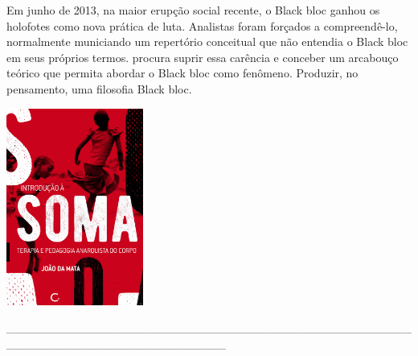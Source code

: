 \medskip

\noindent{}Em junho de 2013, na maior erupção social recente, o Black bloc ganhou os holofotes como nova prática de luta. Analistas foram forçados a compreendê-lo, normalmente municiando um repertório conceitual que não entendia o Black bloc em seus próprios termos. {} procura suprir essa carência e conceber um arcabouço teórico que permita abordar o Black bloc como fenômeno. Produzir, no pensamento, uma filosofia Black bloc.

\hspace{.5cm}

\hspace*{-.4cm}\begin{minipage}[c]{0.45\linewidth}
\small{
{}}
\end{minipage}

\pagebreak

\hspace{.5cm}

\begin{center}
\hspace*{-.5cm}\includegraphics[width=45mm]{./imgs/soma.jpg}
\end{center}

\hspace*{-2cm}\_\_\_\_\_\_\_\_\_\_\_\_\_\_\_\_\_\_\_\_\_\_\_\_\_\_\_\_\_\_\_\_\_\_\_\_\_\_\_\_\_\_\_\_\_\_\_\_\_\_\_\_\_\_\_\_\_\_\_\_\_\_\_\_\_\_\_\_\_\_\_\_\_\_

